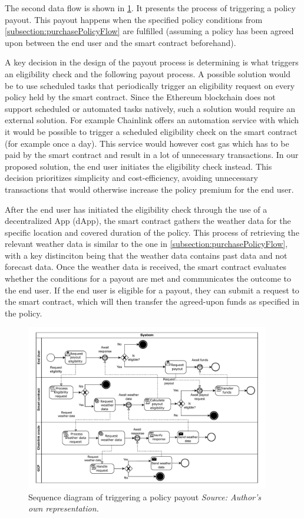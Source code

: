 The second data flow is shown in \cref{fig:payoutFlow}. It presents the process of triggering a policy payout. This payout happens when the specified policy conditions from \cref{subsection:purchasePolicyFlow} are fulfilled (assuming a policy has been agreed upon between the end user and the smart contract beforehand). 

A key decision in the design of the payout process is determining is what triggers an eligibility check and the following payout process. A possible solution would be to use scheduled tasks that periodically trigger an eligibility request on every policy held by the smart contract. Since the Ethereum blockchain does not support scheduled or automated tasks natively, such a solution would require an external solution. For example Chainlink offers an automation service \autocite{chainlink_automation} with which it would be possible to trigger a scheduled eligibility check on the smart contract (for example once a day). This service would however cost gas which has to be paid by the smart contract and result in a lot of unnecessary transactions. In our proposed solution, the end user initiates the eligibility check instead. This decision prioritizes simplicity and cost-efficiency, avoiding unnecessary transactions that would otherwise increase the policy premium for the end user.

After the end user has initiated the eligibility check through the use of a decentralized App (dApp), the smart contract gathers the weather data for the specific location and covered duration of the policy. This process of retrieving the relevant weather data is similar to the one in \cref{subsection:purchasePolicyFlow}, with a key distinciton being that the weather data contains past data and not forecast data. Once the weather data is received, the smart contract evaluates whether the conditions for a payout are met and communicates the outcome to the end user. If the end user is eligible for a payout, they can submit a request to the smart contract, which will then transfer the agreed-upon funds as specified in the policy.


\begin{figure}[h]
    \centering
    \includegraphics[width=0.95\textwidth]{figures/flow-policy-payout-trigger.drawio.pdf}
    \caption{Sequence diagram of triggering a policy payout \textit{Source: Author's own representation.}}
    \label{fig:payoutFlow}
\end{figure}

